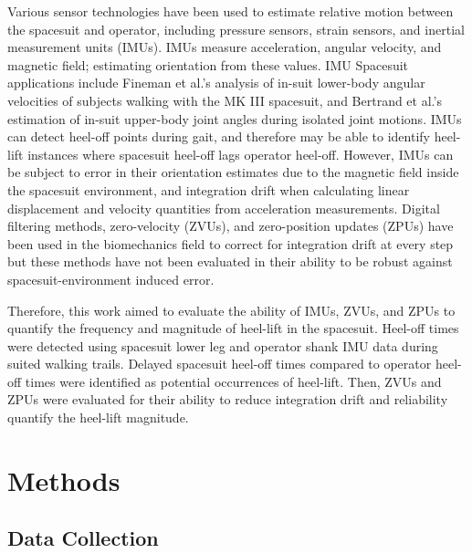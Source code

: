 \documentclass[defaultstyle,11pt]{comps}
\begin{document}
Various sensor technologies have been used to estimate relative motion between the spacesuit and operator, including pressure sensors\citep{Chappell2017}, strain sensors\citep{Vu2020}, and inertial measurement units (IMUs)\citep{Bertrand2014, Fineman2018}.
IMUs measure acceleration, angular velocity, and magnetic field; estimating orientation from these values.
IMU Spacesuit applications include Fineman et al.'s\citep{Fineman2018} analysis of in-suit lower-body angular velocities of subjects walking with the MK III spacesuit, and Bertrand et al.'s \citep{Bertrand2014} estimation of in-suit upper-body joint angles during isolated joint motions.
IMUs can detect heel-off points during gait\citep{Fischer2013, Rebula2013}, and therefore may be able to identify heel-lift instances where spacesuit heel-off lags operator heel-off.
However, IMUs can be subject to error in their orientation estimates due to the magnetic field inside the spacesuit environment, and integration drift when calculating linear displacement and velocity quantities from acceleration measurements.
Digital filtering methods, zero-velocity (ZVUs), and zero-position updates (ZPUs) have been used in the biomechanics field to correct for integration drift at every step \citep{Feliz2009, Rebula2013} but these methods have not been evaluated in their ability to be robust against spacesuit-environment induced error.

Therefore, this work aimed to evaluate the ability of IMUs, ZVUs, and ZPUs to quantify the frequency and magnitude of heel-lift in the spacesuit.
Heel-off times were detected using spacesuit lower leg and operator shank IMU data during suited walking trails.
Delayed spacesuit heel-off times compared to operator heel-off times were identified as potential occurrences of heel-lift.
Then, ZVUs and ZPUs were evaluated for their ability to reduce integration drift and reliability quantify the heel-lift magnitude.

\hypertarget{methods}{%
\section{Methods}\label{methods}}

\hypertarget{data-collection}{%
\subsection{Data Collection}\label{data-collection}}
\end{document}
